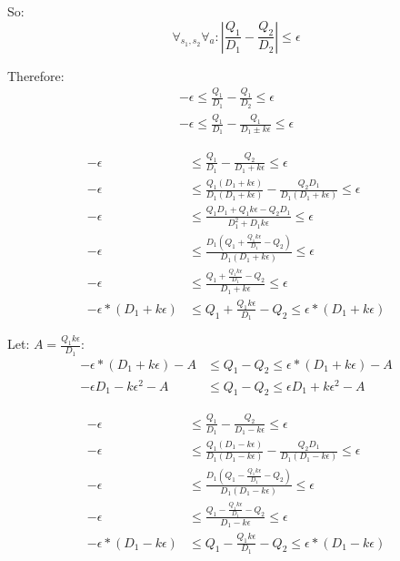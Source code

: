 \documentclass[11pt]{amsart}
\begin{document}
So:
\begin{equation}
\forall_{s_1,s_2} \forall_a : | \frac{Q_1}{D_1} - \frac{Q_2}{D_2} | \leq \epsilon
\end{equation}

Therefore:
\begin{align*}
-\epsilon \leq \frac{Q_1}{D_1} - \frac{Q_1}{D_2} \leq \epsilon \\
-\epsilon \leq \frac{Q_1}{D_1} - \frac{Q_1}{D_1 \pm k\epsilon} \leq \epsilon
\end{align*}

\encircle{+}
\begin{align*}
-\epsilon &\leq \frac{Q_1}{D_1} - \frac{Q_2}{D_1 + k\epsilon} \leq \epsilon \\
-\epsilon &\leq \frac{Q_1 (D_1 + k\epsilon)}{D_1(D_1 + k\epsilon)} - \frac{Q_2 D_1}{D_1 (D_1 + k\epsilon)} \leq \epsilon \\
-\epsilon &\leq \frac{Q_1 D_1 + Q_1 k \epsilon - Q_2 D_1}{D_1^2 + D_1 k \epsilon} \leq \epsilon \\
-\epsilon &\leq \frac{D_1 (Q_1 + \frac{Q_1 k \epsilon}{D_1} - Q_2)}{D_1 (D_1 + k \epsilon)} \leq \epsilon \\
-\epsilon &\leq \frac{Q_1 + \frac{Q_1 k \epsilon}{D_1} - Q_2}{D_1 + k \epsilon} \leq \epsilon \\
-\epsilon*(D_1 + k \epsilon) &\leq Q_1 + \frac{Q_1 k \epsilon}{D_1} - Q_2 \leq \epsilon*(D_1 + k \epsilon)
\end{align*}

Let: $A = \frac{Q_1 k \epsilon}{D_1}$:
\begin{align*}
-\epsilon*(D_1 + k \epsilon) - A &\leq Q_1 - Q_2 \leq \epsilon*(D_1 + k \epsilon) - A \\
-\epsilon D_1 - k \epsilon^2 - A &\leq Q_1 - Q_2 \leq \epsilon D_1 + k \epsilon^2 - A
\end{align*}


\encircle{-}
\begin{align*}
-\epsilon &\leq \frac{Q_1}{D_1} - \frac{Q_2}{D_1 - k\epsilon} \leq \epsilon \\
-\epsilon &\leq \frac{Q_1 (D_1 - k\epsilon)}{D_1(D_1 - k\epsilon)} - \frac{Q_2 D_1}{D_1 (D_1 - k\epsilon)} \leq \epsilon \\
-\epsilon &\leq \frac{D_1 (Q_1 - \frac{Q_1 k \epsilon}{D_1} - Q_2)}{D_1 (D_1 - k \epsilon)} \leq \epsilon \\
-\epsilon &\leq \frac{Q_1 - \frac{Q_1 k \epsilon}{D_1} - Q_2}{D_1 - k \epsilon} \leq \epsilon \\
-\epsilon*(D_1 - k \epsilon) &\leq Q_1 - \frac{Q_1 k \epsilon}{D_1} - Q_2 \leq \epsilon*(D_1 - k \epsilon)
\end{align*}
\end{document}
